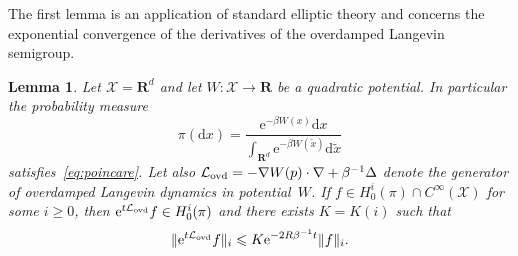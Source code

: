 \documentclass[11pt,a4paper]{article}
\newcommand{\e}{\mathrm{e}}
\newcommand{\real}{\mathbf R}
\newcommand{\grad}{\nabla}
\renewcommand{\d}{\mathrm d}
\theoremstyle{plain}
\newtheorem{lemma}[theorem]{Lemma}
\numberwithin{equation}{section}
\renewcommand{\leq}{\leqslant}
\renewcommand{\geq}{\geqslant}
\begin{document}
The first lemma is an application of standard elliptic theory and
concerns the exponential convergence of the derivatives of the overdamped Langevin semigroup.
\begin{lemma}
    \label{lemma:overdamped_langevin_decay_derivatives}
    Let $\mathcal X = \real^d$ and let $W: \mathcal X \to \real$ be a quadratic potential.
    In particular the probability measure
    \[
        \pi(\d x) = \frac{\e^{- \beta W(x)} \d x}{\int_{\real^d} \e^{-\beta W(\widetilde x)} \d \widetilde x}
    \]
    satisfies~\eqref{eq:poincare}.
    Let also $\mathcal L_{\rm ovd} = - \grad W(p) \cdot \grad + \beta^{-1} \Delta$ denote the generator of overdamped Langevin dynamics in potential~$W$.
    If $f \in H^i_0(\pi) \cap C^{\infty}(\mathcal X)$ for some $i \geq 0$,
    then $\e^{t \mathcal L_{\rm ovd}} f \in H^i_0(\pi)$ and there exists $K = K(i)$ such that
    \[
        \norm*{\e^{t \mathcal L_{\rm ovd}} f}_i \leq K \e^{- 2 R \beta^{-1} t} \norm*{f}_i.
    \]
\end{lemma}
\end{document}
